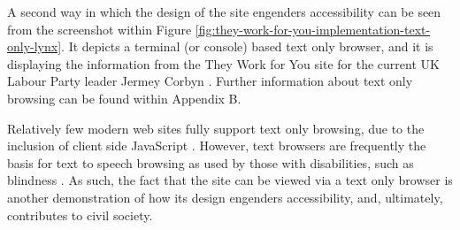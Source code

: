 A second way in which the design of the site engenders accessibility can be seen from the screenshot within Figure \ref{fig:they-work-for-you-implementation-text-only-lynx}.
It depicts a terminal (or console) based text only browser, and it is displaying the information from the They Work for You site for the current UK Labour Party leader Jermey Corbyn \cite{jeremy-corbyn-wiki}.
Further information about text only browsing can be found within Appendix B.

Relatively few modern web sites fully support text only browsing, due to the inclusion of  client side JavaScript \cite{web-2.0-technologies}.
However, text browsers are frequently the basis for text to speech browsing as used by those with disabilities, such as blindness \cite{shelter-guide-web-accessibility}.
As such, the fact that the site can be viewed via a text only browser is another demonstration of how its design engenders accessibility, and, ultimately, contributes to civil society.
